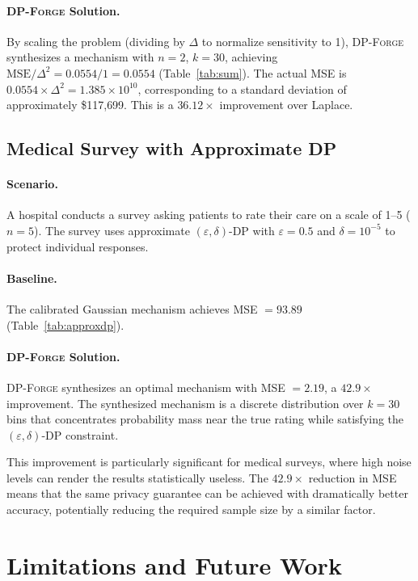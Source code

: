 \documentclass[11pt,a4paper]{article}
\newcommand{\dpforge}{\textsc{DP-Forge}}
\newcommand{\eps}{\varepsilon}
\begin{document}
\paragraph{\dpforge{} Solution.}
By scaling the problem (dividing by $\Delta$ to normalize sensitivity to 1),
\dpforge{} synthesizes a mechanism with $n = 2$, $k = 30$, achieving
$\text{MSE} / \Delta^2 = 0.0554/1 = 0.0554$ (Table~\ref{tab:sum}).
The actual MSE is $0.0554 \times \Delta^2 = 1.385 \times 10^{10}$, corresponding
to a standard deviation of approximately \$117{,}699.  This is a $36.12\times$
improvement over Laplace.

\subsection{Medical Survey with Approximate DP}

\paragraph{Scenario.}
A hospital conducts a survey asking patients to rate their care on a scale
of 1--5 ($n = 5$).  The survey uses approximate $(\eps, \delta)$-DP with
$\eps = 0.5$ and $\delta = 10^{-5}$ to protect individual responses.

\paragraph{Baseline.}
The calibrated Gaussian mechanism achieves MSE $= 93.89$
(Table~\ref{tab:approxdp}).

\paragraph{\dpforge{} Solution.}
\dpforge{} synthesizes an optimal mechanism with MSE $= 2.19$, a $42.9\times$
improvement.  The synthesized mechanism is a discrete distribution over $k = 30$
bins that concentrates probability mass near the true rating while satisfying
the $(\eps, \delta)$-DP constraint.

This improvement is particularly significant for medical surveys, where high
noise levels can render the results statistically useless.  The $42.9\times$
reduction in MSE means that the same privacy guarantee can be achieved with
dramatically better accuracy, potentially reducing the required sample size
by a similar factor.


\section{Limitations and Future Work}
\label{sec:limitations}
\end{document}
